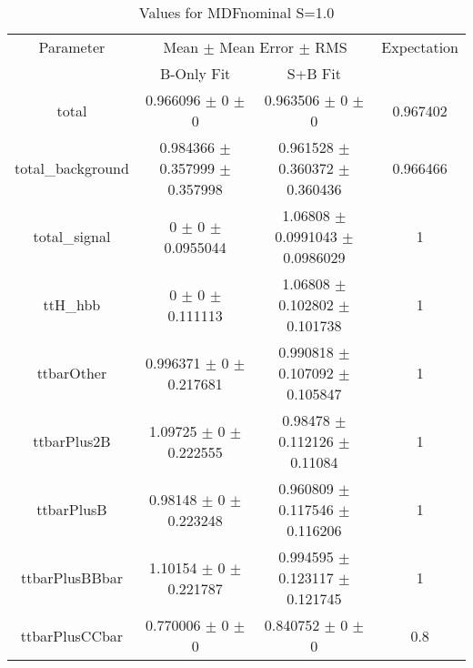 \begin{table}
\centering
\caption{Values for MDFnominal S=1.0}
\begin{tabular}{cccc}
\toprule
Parameter & \multicolumn{2}{c}{Mean $\pm$ Mean Error $\pm$ RMS} & Expectation\\
 & B-Only Fit & S+B Fit & \\
\midrule
total & \num{0.966096} $\pm$ \num{0} $\pm$ \num{0} & \num{0.963506} $\pm$ \num{0} $\pm$ \num{0} & \num{0.967402}\\
total\_background & \num{0.984366} $\pm$ \num{0.357999} $\pm$ \num{0.357998} & \num{0.961528} $\pm$ \num{0.360372} $\pm$ \num{0.360436} & \num{0.966466}\\
total\_signal & \num{0} $\pm$ \num{0} $\pm$ \num{0.0955044} & \num{1.06808} $\pm$ \num{0.0991043} $\pm$ \num{0.0986029} & \num{1}\\
ttH\_hbb & \num{0} $\pm$ \num{0} $\pm$ \num{0.111113} & \num{1.06808} $\pm$ \num{0.102802} $\pm$ \num{0.101738} & \num{1}\\
ttbarOther & \num{0.996371} $\pm$ \num{0} $\pm$ \num{0.217681} & \num{0.990818} $\pm$ \num{0.107092} $\pm$ \num{0.105847} & \num{1}\\
ttbarPlus2B & \num{1.09725} $\pm$ \num{0} $\pm$ \num{0.222555} & \num{0.98478} $\pm$ \num{0.112126} $\pm$ \num{0.11084} & \num{1}\\
ttbarPlusB & \num{0.98148} $\pm$ \num{0} $\pm$ \num{0.223248} & \num{0.960809} $\pm$ \num{0.117546} $\pm$ \num{0.116206} & \num{1}\\
ttbarPlusBBbar & \num{1.10154} $\pm$ \num{0} $\pm$ \num{0.221787} & \num{0.994595} $\pm$ \num{0.123117} $\pm$ \num{0.121745} & \num{1}\\
ttbarPlusCCbar & \num{0.770006} $\pm$ \num{0} $\pm$ \num{0} & \num{0.840752} $\pm$ \num{0} $\pm$ \num{0} & \num{0.8}\\
\bottomrule
\end{tabular}
\end{table}